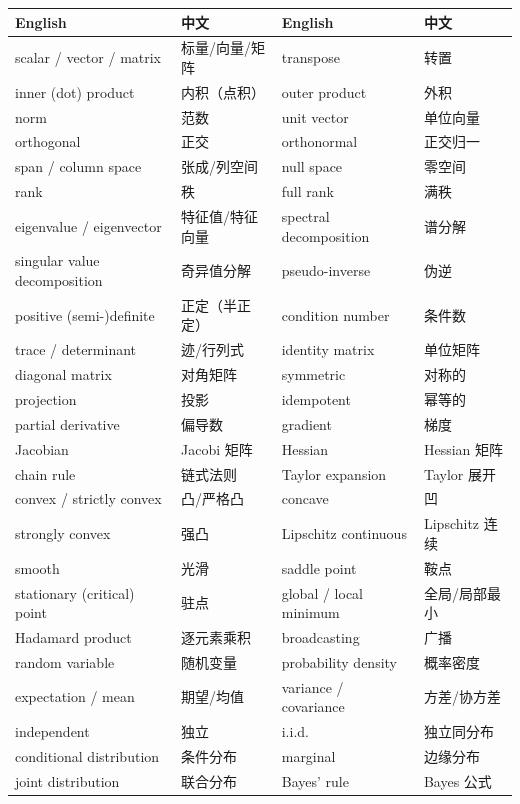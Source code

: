 \documentclass[UTF8,a4paper,11pt]{ctexart}
\theoremstyle{definition}
\theoremstyle{plain}
\theoremstyle{remark}
\begin{document}
\begin{center}
\small
\setlength{\tabcolsep}{3pt}
\begin{tabular}{@{}llll@{}}
\toprule
English & 中文 & English & 中文\\
\midrule
scalar / vector / matrix & 标量/向量/矩阵 & transpose & 转置\\
inner (dot) product & 内积（点积） & outer product & 外积\\
norm & 范数 & unit vector & 单位向量\\
orthogonal & 正交 & orthonormal & 正交归一\\
span / column space & 张成/列空间 & null space & 零空间\\
rank & 秩 & full rank & 满秩\\
eigenvalue / eigenvector & 特征值/特征向量 & spectral decomposition & 谱分解\\
singular value decomposition & 奇异值分解 & pseudo-inverse & 伪逆\\
positive (semi-)definite & 正定（半正定） & condition number & 条件数\\
trace / determinant & 迹/行列式 & identity matrix & 单位矩阵\\
diagonal matrix & 对角矩阵 & symmetric & 对称的\\
projection & 投影 & idempotent & 幂等的\\
partial derivative & 偏导数 & gradient & 梯度\\
Jacobian & Jacobi 矩阵 & Hessian & Hessian 矩阵\\
chain rule & 链式法则 & Taylor expansion & Taylor 展开\\
convex / strictly convex & 凸/严格凸 & concave & 凹\\
strongly convex & 强凸 & Lipschitz continuous & Lipschitz 连续\\
smooth & 光滑 & saddle point & 鞍点\\
stationary (critical) point & 驻点 & global / local minimum & 全局/局部最小\\
Hadamard product & 逐元素乘积 & broadcasting & 广播\\
random variable & 随机变量 & probability density & 概率密度\\
expectation / mean & 期望/均值 & variance / covariance & 方差/协方差\\
independent & 独立 & i.i.d. & 独立同分布\\
conditional distribution & 条件分布 & marginal & 边缘分布\\
joint distribution & 联合分布 & Bayes' rule & Bayes 公式\\

\end{tabular}
\end{center}
\end{document}
